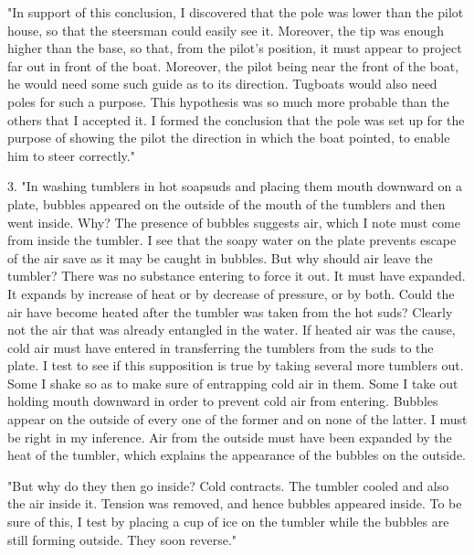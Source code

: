 \documentclass[letterpaper]{book}
\begin{document}
"In support of this conclusion, I discovered that the pole was lower
than the pilot house, so that the steersman could easily see it.
Moreover, the tip was enough higher than the base, so that, from the
pilot's position, it must appear to project far out in front of the
boat. Moreover, the pilot being near the front of the boat, he would
need some such guide as to its direction. Tugboats would also need poles
for such a purpose. This hypothesis was so much more probable than the
others that I accepted it. I formed the conclusion that the pole was set
up for the purpose of showing the pilot the direction in which the boat
pointed, to enable him to steer correctly."


3. "In washing tumblers in hot soapsuds and placing them mouth downward
on a plate, bubbles appeared on the outside of the mouth of the tumblers
and then went inside. Why? The presence of bubbles suggests air, which I
note must come from inside the tumbler. I see that the soapy water on
the plate prevents escape of the air save as it may be caught in
bubbles. But why should air leave the tumbler? There was no substance
entering to force it out. It must have expanded. It expands by increase
of heat or by decrease of pressure, or by both. Could the air have
become heated after the tumbler was taken from the hot suds? Clearly not
the air that was already
entangled
in the water. If heated air was the cause, cold air must have entered in
transferring the tumblers from the suds to the plate. I test to see if
this supposition is true by taking several more tumblers out. Some I
shake so as to make sure of entrapping cold air in them. Some I take out
holding mouth downward in order to prevent cold air from entering.
Bubbles appear on the outside of every one of the former and on none of
the latter. I must be right in my inference. Air from the outside must
have been expanded by the heat of the tumbler, which explains the
appearance of the bubbles on the outside.

"But why do they then go inside? Cold contracts. The tumbler cooled and
also the air inside it. Tension was removed, and hence bubbles appeared
inside. To be sure of this, I test by placing a cup of ice on the
tumbler while the bubbles are still forming outside. They soon reverse."

\end{document}
